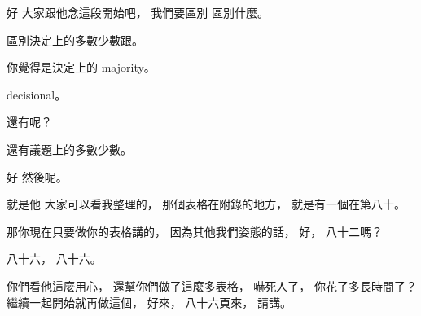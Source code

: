 \hypertarget{w06:cue:3015}{}好 大家跟他念這段開始吧，
\hypertarget{w06:cue:3016}{}我們要區別 區別什麼。

\hypertarget{w06:cue:3017}{}區別決定上的多數少數跟。

\hypertarget{w06:cue:3018}{}你覺得是決定上的 majority。

\hypertarget{w06:cue:3019}{}decisional。

\hypertarget{w06:cue:3020}{}還有呢？

\hypertarget{w06:cue:3021}{}還有議題上的多數少數。

\hypertarget{w06:cue:3022}{}好 然後呢。

\hypertarget{w06:cue:3023}{}就是他 大家可以看我整理的，
\hypertarget{w06:cue:3024}{}那個表格在附錄的地方，
\hypertarget{w06:cue:3025}{}就是有一個在第八十。

\hypertarget{w06:cue:3026}{}那你現在只要做你的表格講的，
\hypertarget{w06:cue:3027}{}因為其他我們姿態的話，
\hypertarget{w06:cue:3028}{}好，
\hypertarget{w06:cue:3029}{}八十二嗎？

\hypertarget{w06:cue:3030}{}八十六，
\hypertarget{w06:cue:3031}{}八十六。

\hypertarget{w06:cue:3032}{}你們看他這麼用心，
\hypertarget{w06:cue:3033}{}還幫你們做了這麼多表格，
\hypertarget{w06:cue:3034}{}嚇死人了，
\hypertarget{w06:cue:3035}{}你花了多長時間了？
\hypertarget{w06:cue:3036}{}繼續一起開始就再做這個，
\hypertarget{w06:cue:3037}{}好來，
\hypertarget{w06:cue:3038}{}八十六頁來，
\hypertarget{w06:cue:3039}{}請講。

